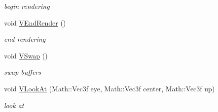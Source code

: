 \begin{DoxyCompactItemize}
\begin{DoxyCompactList}\small\item\em begin rendering \item\end{DoxyCompactList}\item 
\hypertarget{classPlatform_1_1Renderer_1_1GLX_1_1Renderer_a4e42fc9ac6435e895b422b25e44c7673}{
void \hyperlink{classPlatform_1_1Renderer_1_1GLX_1_1Renderer_a4e42fc9ac6435e895b422b25e44c7673}{VEndRender} ()}
\label{classPlatform_1_1Renderer_1_1GLX_1_1Renderer_a4e42fc9ac6435e895b422b25e44c7673}

\begin{DoxyCompactList}\small\item\em end rendering \item\end{DoxyCompactList}\item 
\hypertarget{classPlatform_1_1Renderer_1_1GLX_1_1Renderer_af953c2affe70a800936c08de5936c97f}{
void \hyperlink{classPlatform_1_1Renderer_1_1GLX_1_1Renderer_af953c2affe70a800936c08de5936c97f}{VSwap} ()}
\label{classPlatform_1_1Renderer_1_1GLX_1_1Renderer_af953c2affe70a800936c08de5936c97f}

\begin{DoxyCompactList}\small\item\em swap buffers \item\end{DoxyCompactList}\item 
\hypertarget{classPlatform_1_1Renderer_1_1GLX_1_1Renderer_a8167d682417463005d5aaa6cac12a8cf}{
void \hyperlink{classPlatform_1_1Renderer_1_1GLX_1_1Renderer_a8167d682417463005d5aaa6cac12a8cf}{VLookAt} (Math::Vec3f eye, Math::Vec3f center, Math::Vec3f up)}
\label{classPlatform_1_1Renderer_1_1GLX_1_1Renderer_a8167d682417463005d5aaa6cac12a8cf}

\begin{DoxyCompactList}\small\item\em look at \item\end{DoxyCompactList}\end{DoxyCompactItemize}
